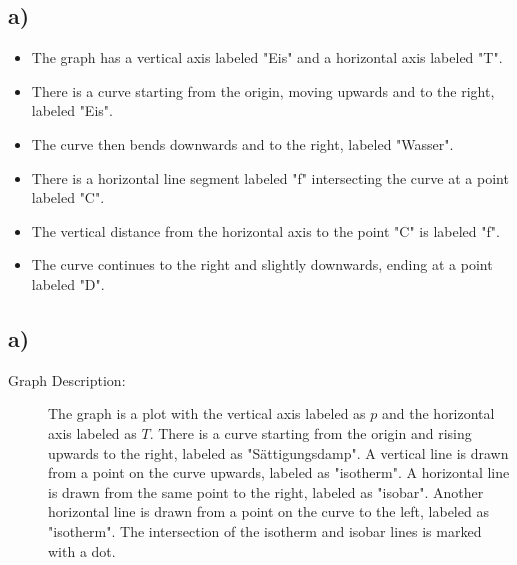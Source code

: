 

\subsection*{a)}

\begin{itemize}
    \item The graph has a vertical axis labeled "Eis" and a horizontal axis labeled "T".
    \item There is a curve starting from the origin, moving upwards and to the right, labeled "Eis".
    \item The curve then bends downwards and to the right, labeled "Wasser".
    \item There is a horizontal line segment labeled "f" intersecting the curve at a point labeled "C".
    \item The vertical distance from the horizontal axis to the point "C" is labeled "f".
    \item The curve continues to the right and slightly downwards, ending at a point labeled "D".
\end{itemize}



\subsection*{a)}

\begin{description}
    \item[Graph Description:] The graph is a plot with the vertical axis labeled as $p$ and the horizontal axis labeled as $T$. There is a curve starting from the origin and rising upwards to the right, labeled as "Sättigungsdamp". A vertical line is drawn from a point on the curve upwards, labeled as "isotherm". A horizontal line is drawn from the same point to the right, labeled as "isobar". Another horizontal line is drawn from a point on the curve to the left, labeled as "isotherm". The intersection of the isotherm and isobar lines is marked with a dot.
\end{description}